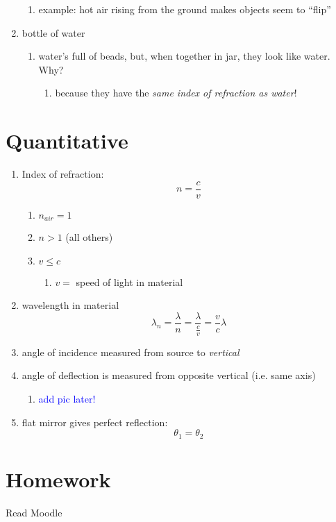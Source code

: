 \documentclass[twocolumn,draft]{article}
\newcommand{\bt}[1]{\textcolor{blue}{#1}}
\begin{document}
\begin{enumerate}
\begin{enumerate}
			\item example: hot air rising from the
			ground makes objects seem to ``flip''
		\end{enumerate}
	\item bottle of water
		\begin{enumerate}
			\item water's full of beads, but, when
			together in jar, they look like water.
			Why?
				\begin{enumerate}
					\item because they have the 
					\emph{same index of refraction
						as water}!
				\end{enumerate}
		\end{enumerate}
  \end{enumerate}
  
  \section{Quantitative}
  \begin{enumerate}
	\item Index of refraction:
		\begin{equation}
			n = \frac{c}{v}
		\end{equation}
		\begin{enumerate}
		  	\item $n_{air} = 1$
			\item $n > 1$ (all others)
			\item $v \leq c$
				\begin{enumerate}
					\item $v=$ speed of light in
					material
				\end{enumerate}
		\end{enumerate}
	\item wavelength in material
		\begin{equation}
			\lambda_{n} = \frac{\lambda}{n}
						= \frac{\lambda}{\frac{c}{v}}
						= \frac{v}{c}\lambda
		\end{equation}
	\item angle of incidence measured from source to
	\emph{vertical}
	\item angle of deflection is measured from
	opposite vertical (i.e. same axis)
		\begin{enumerate}
			\item \bt{add pic later!}
		\end{enumerate}
	\item flat mirror gives perfect reflection:
		\begin{equation}
			\theta_{1} = \theta_{2}
		\end{equation}
  \end{enumerate}
  
  \section{Homework}
  \noindent Read Moodle
  
\end{document}
